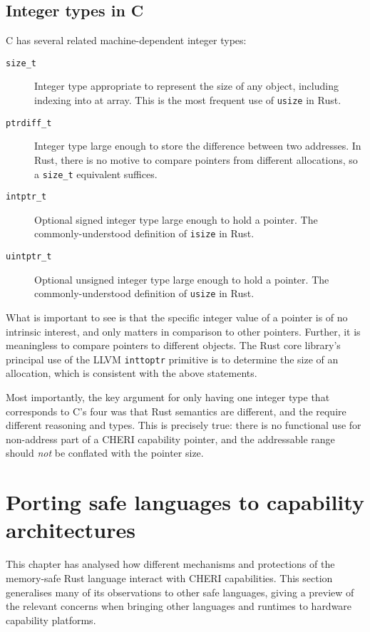 \documentclass[dissertation.tex]{subfiles}
\begin{document}
\subsection{Integer types in C}
C has several related machine-dependent integer types:

\begin{description}
    \item[\texttt{size\_t}] Integer type appropriate to represent the
    size of any object, including indexing into at array.
    This is the most frequent use of \texttt{usize} in Rust.
    \item[\texttt{ptrdiff\_t}] Integer type large enough to store the
    difference between two addresses. In Rust, there is no motive to
    compare pointers from different allocations, so a \texttt{size\_t}
    equivalent suffices.
    \item[\texttt{intptr\_t}] Optional signed integer type large enough to hold
    a pointer. The commonly-understood definition of \texttt{isize} in Rust.
    \item[\texttt{uintptr\_t}] Optional unsigned integer type large enough to hold
    a pointer. The commonly-understood definition of \texttt{usize} in Rust.
\end{description}

What is important to see is that the specific integer value of a pointer
is of no intrinsic interest, and only matters in comparison to other
pointers.
Further, it is meaningless to compare pointers to different objects.
The Rust core library's principal use of the LLVM \texttt{inttoptr}
primitive is to determine the size of an allocation, which is consistent
with the above statements.

Most importantly, the key argument for only having one integer type that
corresponds to C's four was that Rust semantics are different, and the
require different reasoning and types.
This is precisely true: there is no functional use for non-address part
of a CHERI capability pointer, and the addressable range should
\emph{not} be conflated with the pointer size.


\section{Porting safe languages to capability architectures}
\label{sec:eval-porting}

This chapter has analysed how different mechanisms and protections of
the memory-safe Rust language interact with CHERI capabilities.
This section generalises many of its observations to other safe
languages, giving a preview of the relevant concerns when bringing other
languages and runtimes to hardware capability platforms.
\end{document}
